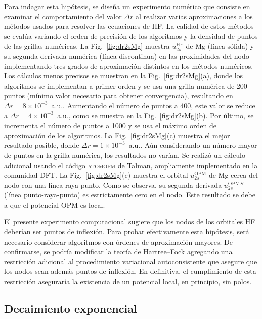 Para indagar esta hipótesis, se diseña un experimento numérico que 
consiste en examinar el comportamiento del valor $\Delta r$ al realizar 
varias aproximaciones a los métodos usados para resolver las 
ecuaciones de HF. La calidad de estos métodos se evalúa variando el 
orden de precisión de los algoritmos y la densidad de puntos de las 
grillas numéricas. 
La Fig.~\ref{fig:dr2sMg} muestra $u_{2s}^{\mathrm{HF}}$ de Mg (línea 
sólida) y su segunda derivada numérica (línea discontinua) en las 
proximidades del nodo implementando tres grados de aproximación 
distintos en los métodos numéricos. Los cálculos menos precisos se 
muestran en la Fig.~\ref{fig:dr2sMg}(a), donde los algoritmos se 
implementan a primer orden y se usa una grilla numérica de 200 puntos 
(mínimo valor necesario para obtener convergencia), resultando en 
$\Delta r=8\times 10^{-3}$~a.u.. Aumentando el número de puntos a 400, 
este valor se reduce a $\Delta r=4\times 10^{-3}$~a.u., como se muestra 
en la Fig.~\ref{fig:dr2sMg}(b). Por último, se incrementa el número de 
puntos a 1000 y se usa el máximo orden de aproximación de los 
algoritmos. La Fig.~\ref{fig:dr2sMg}(c) muestra el mejor resultado 
posible, donde $\Delta r=1\times 10^{-3}$~a.u.. Aún considerando un 
número mayor de puntos en la grilla numérica, los resultados no varían. 
Se realizó un cálculo adicional usando el código \textsc{atomopm} de 
Talman, ampliamente implementado en la comunidad DFT. La 
Fig.~\ref{fig:dr2sMg}(c) muestra el orbital $u_{2s}^{\mathrm{OPM}}$ de 
Mg cerca del nodo con una línea raya-punto. Como se observa, su segunda 
derivada $u_{2s}^{\mathrm{OPM}}''$ (línea punto-raya-punto) es 
estrictamente cero en el nodo. Este resultado se debe a que el potencial
OPM es local. 

El presente experimento computacional sugiere que los nodos de los 
orbitales HF deberían ser puntos de inflexión. Para probar efectivamente 
esta hipótesis, será necesario considerar algoritmos con órdenes de 
aproximación mayores. De confirmarse, se podría modificar la teoría de 
Hartree--Fock agregando una restricción adicional al procedimiento 
variacional autoconsistente que asegure que los nodos sean además puntos 
de inflexión. En definitiva, el cumplimiento de esta restricción 
aseguraría la existencia de un potencial local, en principio, sin polos. 

\subsection{Decaimiento exponencial}
\label{subsec:decaimientoHF}


